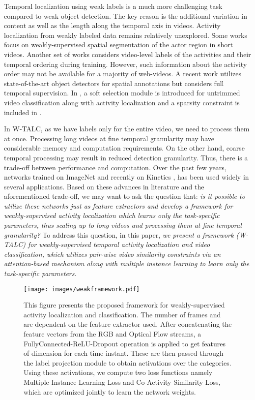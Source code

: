 \documentclass[runningheads]{llncs}
\begin{document}
Temporal localization using weak labels is a much more 
challenging task compared to weak object detection. The key reason is the additional variation in content as well as the length along the temporal axis in videos. 
Activity localization from weakly labeled data remains relatively unexplored. Some works \cite{siva2011weakly,yan2017weakly,sultani2016if} focus on weakly-supervised spatial segmentation of the actor region in short videos. Another set of works \cite{bojanowski2014weakly,kuehne2017weakly,richard2017weakly,huang2016connectionist} considers video-level labels of the activities and their temporal ordering during training. However, such information about the activity order may not be available for a majority of web-videos. A recent work \cite{weinzaepfel2017human} utilizes state-of-the-art object detectors for spatial annotations but considers full temporal supervision. In \cite{wang2017untrimmednets}, a soft selection module is introduced for untrimmed video classification along with activity localization and a sparsity constraint is included in \cite{nguyen2017weakly}.

In W-TALC, as we have labels only for the entire video, we need to process them at once. Processing long videos at fine temporal granularity may have considerable memory and computation requirements. On the other hand, coarse temporal processing may result in reduced detection granularity. Thus, there is a trade-off between performance and computation. Over the past few years, networks trained on ImageNet \cite{deng2009imagenet} and recently on Kinetics \cite{kay2017kinetics}, has been used widely in several applications. Based on these advances in literature and the aforementioned trade-off, we may want to ask the question that: \textit{is it possible to utilize these networks just as feature extractors and develop a framework for weakly-supervised activity localization which learns only the task-specific parameters, thus scaling up to long videos and processing them at fine temporal granularity?} To address this question, in this paper, \textit{we present a framework (W-TALC) for weakly-supervised temporal activity localization and video classification, which utilizes pair-wise video similarity constraints via an attention-based mechanism along with multiple instance learning to learn only the task-specific parameters.}

\begin{figure*}[t]
	\centering
	\texttt{[image: images/weakframework.pdf]}
	\caption{This figure presents the proposed framework for weakly-supervised activity localization and classification. The number of frames  and  are dependent on the feature extractor used. After concatenating the feature vectors from the RGB and Optical Flow streams, a FullyConnected-ReLU-Dropout operation is applied to get features of dimension  for each time instant. These are then passed through the label projection module to obtain activations over the categories.  Using these activations, we compute two loss functions namely Multiple Instance Learning Loss and Co-Activity Similarity Loss, which are optimized jointly to learn the network weights.}
	\label{framework}
\end{figure*}
\end{document}
